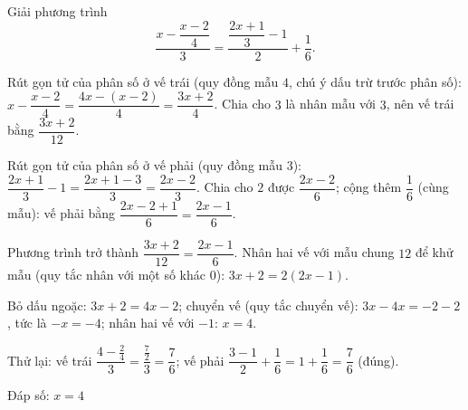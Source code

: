 \begin{problem}[8DS-PT1-027]
Giải phương trình
\[ \dfrac{x - \dfrac{x - 2}{4}}{3} = \dfrac{\dfrac{2x + 1}{3} - 1}{2} + \dfrac{1}{6}. \]

\begin{solution}
Rút gọn tử của phân số ở vế trái (quy đồng mẫu $4$, chú ý dấu trừ trước phân số): $x - \dfrac{x - 2}{4} = \dfrac{4x - (x - 2)}{4} = \dfrac{3x + 2}{4}$. Chia cho $3$ là nhân mẫu với $3$, nên vế trái bằng $\dfrac{3x + 2}{12}$.

Rút gọn tử của phân số ở vế phải (quy đồng mẫu $3$): $\dfrac{2x + 1}{3} - 1 = \dfrac{2x + 1 - 3}{3} = \dfrac{2x - 2}{3}$. Chia cho $2$ được $\dfrac{2x - 2}{6}$; cộng thêm $\dfrac{1}{6}$ (cùng mẫu): vế phải bằng $\dfrac{2x - 2 + 1}{6} = \dfrac{2x - 1}{6}$.

Phương trình trở thành $\dfrac{3x + 2}{12} = \dfrac{2x - 1}{6}$. Nhân hai vế với mẫu chung $12$ để khử mẫu (quy tắc nhân với một số khác $0$): $3x + 2 = 2(2x - 1)$.

Bỏ dấu ngoặc: $3x + 2 = 4x - 2$; chuyển vế (quy tắc chuyển vế): $3x - 4x = -2 - 2$, tức là $-x = -4$; nhân hai vế với $-1$: $x = 4$.

Thử lại: vế trái $\dfrac{4 - \frac{2}{4}}{3} = \dfrac{\frac{7}{2}}{3} = \dfrac{7}{6}$; vế phải $\dfrac{3 - 1}{2} + \dfrac{1}{6} = 1 + \dfrac{1}{6} = \dfrac{7}{6}$ (đúng).

Đáp số: $\boxed{x = 4}$
\end{solution}
\end{problem}

